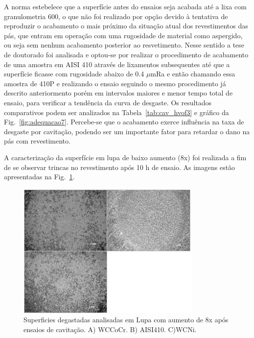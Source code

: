 A norma estebelece que a superfície antes do ensaios seja acabada até a lixa com
granulometria 600, o que não foi realizado por opção devido à tentativa de
reproduzir o acabamento o mais próximo da situação atual dos revestimentos das
pás, que entram em operação com uma rugosidade de material como aspergido, ou
seja sem nenhum acabamento posterior ao resvetimento. Nesse sentido a tese de
doutorado \cite{xiaojun2002effect} foi analisada e optou-se por realizar o
procedimento de acabamento de uma amostra em AISI 410 através de lixamentos
subsequentes até que a superfície ficasse com rugosidade abaixo de 0.4 $\mu$mRa
e então chamando essa amostra de 410P e realizando o ensaio seguindo o mesmo
procedimento já descrito anteriormento porém em intervalos maiores e menor tempo
total de ensaio, para verificar a tendência da curva de desgaste. Os resultados
comparativos podem ser analizados na Tabela~\ref{tab:cav_hvof3} e gráfico da
Fig.~\ref{fig:adequacao7}. Percebe-se que o acabamento exerce influência na taxa
de desgaste por cavitação, podendo ser um importante fator para retardar o dano
na pás com revestimento.

A caracterização da superfície em lupa de baixo aumento (8x) foi realizada a fim
de se observar trincas no revestimento após 10 h de ensaio. As imagens estão
apresentadas na Fig.~\ref{fig:adequacao8}.

\begin{figure}
	\centering
	\includegraphics[width=.8\columnwidth]{method/figs/adequacao/adequacao8.png}
    \caption{Superficies degastadas analisadas em Lupa com aumento de 8x após ensaios de cavitação. A) WCCoCr. B) AISI410. C)WCNi.}
    \label{fig:adequacao8}
\end{figure}